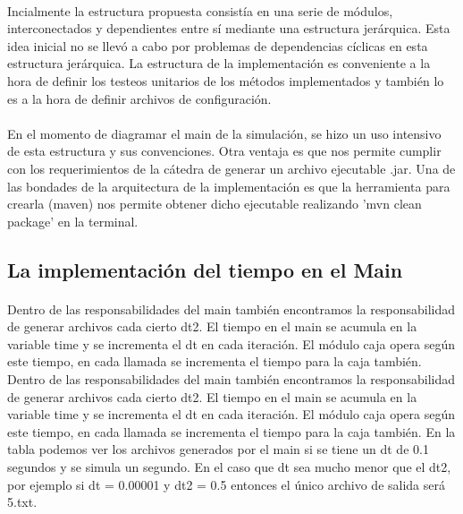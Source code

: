 \documentclass{article}
\begin{document}
\paragraph{}
Incialmente la estructura propuesta consistía en una serie de módulos, interconectados y dependientes entre sí mediante una estructura jerárquica. Esta idea inicial no se llevó a cabo por problemas de dependencias cíclicas en esta estructura jerárquica. La estructura de la implementación es conveniente a la hora de definir los testeos unitarios de los métodos implementados y también lo es a la hora de definir archivos de configuración. 

\paragraph{}
En el momento de diagramar el main de la simulación, se hizo un uso intensivo de esta estructura y sus convenciones. Otra ventaja es que nos permite cumplir con los requerimientos de la cátedra de generar un archivo ejecutable .jar. Una de las bondades de la arquitectura de la implementación es que la herramienta para crearla (maven) nos permite obtener dicho ejecutable realizando 'mvn clean package' en la terminal.

\subsection{La implementación del tiempo en el Main}

\paragraph{}
Dentro de las responsabilidades del main también encontramos la responsabilidad de generar archivos cada cierto dt2. El tiempo en el main se acumula en la variable time y se incrementa el dt en cada iteración. El módulo caja opera según este tiempo, en cada llamada se incrementa el tiempo para la caja también. Dentro de las responsabilidades del main también encontramos la responsabilidad de generar archivos cada cierto dt2. El tiempo en el main se acumula en la variable time y se incrementa el dt en cada iteración. El módulo caja opera según este tiempo, en cada llamada se incrementa el tiempo para la caja también. En la tabla podemos ver los archivos generados por el main si se tiene un dt de 0.1 segundos y se simula un segundo. En el caso que dt sea mucho  menor que el dt2, por ejemplo si dt = 0.00001 y dt2 = 0.5 entonces el único archivo de salida será 5.txt.
\end{document}
